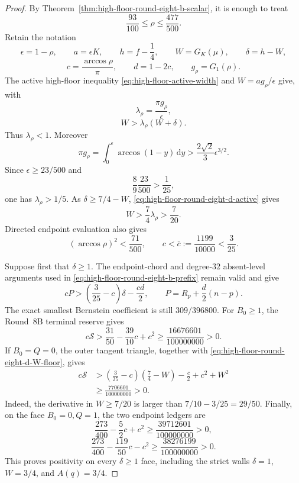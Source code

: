 \documentclass[11pt]{article}
\theoremstyle{remark}
\newcommand{\dd}{\,\mathrm d}
\begin{document}
\begin{proof}
By Theorem~\ref{thm:high-floor-round-eight-b-scalar}, it is enough to
treat
\[
 \frac{93}{100}\leq\rho\leq\frac{477}{500}.
\]
Retain the notation
\[
 \epsilon=1-\rho,\qquad a=\epsilon K,\qquad
 h=f-\frac14,\qquad
 W=G_K(\mu),\qquad \delta=h-W,
\]
\[
 c=\frac{\arccos\rho}{\pi},\qquad d=1-2c,\qquad
 g_\rho=G_1(\rho).
\]
The active high-floor inequality \eqref{eq:high-floor-active-width} and
$W=ag_\rho/\epsilon$ give, with
\[
 \lambda_\rho=\frac{\pi g_\rho}{\epsilon},
\]
\begin{equation}
 W>\lambda_\rho(W+\delta).
 \label{eq:high-floor-round-eight-d-active}
\end{equation}
Thus $\lambda_\rho<1$.  Moreover
\[
 \pi g_\rho
 =\int_0^\epsilon\arccos(1-y)\dd y
 >\frac{2\sqrt2}{3}\epsilon^{3/2}.
\]
Since $\epsilon\geq23/500$ and
\[
 \frac89\frac{23}{500}>\frac1{25},
\]
one has $\lambda_\rho>1/5$.  As
$\delta\geq7/4-W$, \eqref{eq:high-floor-round-eight-d-active} gives
\begin{equation}
 \boxed{W>\frac74\lambda_\rho>\frac7{20}.}
 \label{eq:high-floor-round-eight-d-W-floor}
\end{equation}
Directed endpoint evaluation also gives
\begin{equation}
 (\arccos\rho)^2<\frac{71}{500},\qquad
 c<\bar c:=\frac{1199}{10000}<\frac3{25}.
 \label{eq:high-floor-round-eight-d-ratio}
\end{equation}

Suppose first that $\delta\geq1$.  The endpoint-chord and
degree-$32$ absent-level arguments used in
\eqref{eq:high-floor-round-eight-b-prefix} remain valid and give
\begin{equation}
 cP>
 \left(\frac3{25}-c\right)\delta-\frac{cd}{2},
 \qquad P=R_p+\frac d2(n-p).
 \label{eq:high-floor-round-eight-d-prefix}
\end{equation}
The exact smallest Bernstein coefficient is still $309/396800$.
For $B_0\geq1$, the Round~8B terminal reserve gives
\[
 c\mathcal S>
 \frac{31}{50}-\frac{39}{10}c+c^2
 \geq\frac{16676601}{100000000}>0.
\]
If $B_0=Q=0$, the outer tangent triangle, together with
\eqref{eq:high-floor-round-eight-d-W-floor}, gives
\[
\begin{aligned}
 c\mathcal S
 &>\left(\frac3{25}-c\right)\left(\frac74-W\right)
   -\frac c2+c^2+W^2\\
 &\geq\frac{7706601}{100000000}>0.
\end{aligned}
\]
Indeed, the derivative in $W\geq7/20$ is larger than
$7/10-3/25=29/50$.  Finally, on the face $B_0=0,Q=1$, the two endpoint
ledgers are
\[
 \frac{273}{400}-\frac52c+c^2
 \geq\frac{39712601}{100000000}>0,
\]
\[
 \frac{273}{400}-\frac{119}{50}c-c^2
 \geq\frac{38276199}{100000000}>0.
\]
This proves positivity on every $\delta\geq1$ face, including the strict
walls $\delta=1$, $W=3/4$, and $A(q)=3/4$.


\end{proof}
\end{document}
